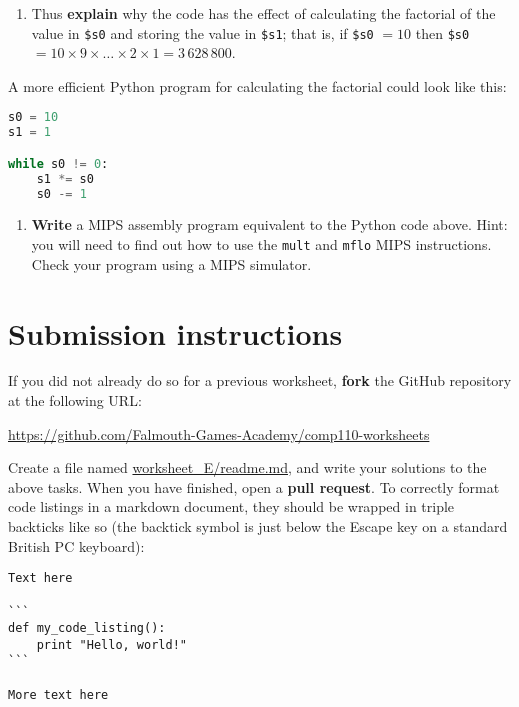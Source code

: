 \documentclass{../../../fal_assignment}
\begin{document}
\begin{enumerate}[resume,label=(\alph*)]
	\item Thus \textbf{explain} why the code has the effect of calculating the factorial of the value in \lstinline{$s0}
and storing the value in \lstinline{$s1};
that is, if \lstinline{$s0} $= 10$ then \lstinline{$s0} $= 10 \times 9 \times \dots \times 2 \times 1 = 3\,628\,800$.
\end{enumerate}

A more efficient Python program for calculating the factorial could look like this:

\begin{lstlisting}[language=Python]
s0 = 10
s1 = 1

while s0 != 0:
    s1 *= s0
    s0 -= 1
\end{lstlisting}

\begin{enumerate}[resume,label=(\alph*)]
	\item \textbf{Write} a MIPS assembly program equivalent to the Python code above.
	Hint: you will need to find out how to use the \lstinline{mult} and \lstinline{mflo} MIPS instructions.
	Check your program using a MIPS simulator.
\end{enumerate}

\iffalse
$ %
\fi

\section*{Submission instructions}

If you did not already do so for a previous worksheet, \textbf{fork} the GitHub repository at the following URL:

\url{https://github.com/Falmouth-Games-Academy/comp110-worksheets}

Create a file named \url{worksheet_E/readme.md}, and write your solutions to the above tasks.
When you have finished, open a \textbf{pull request}.
To correctly format code listings in a markdown document, they should be wrapped in triple backticks like so
(the backtick symbol is just below the Escape key on a standard British PC keyboard):

\begin{lstlisting}[language={},upquote=true]
Text here

```
def my_code_listing():
    print "Hello, world!"
```

More text here
\end{lstlisting}
\end{document}
